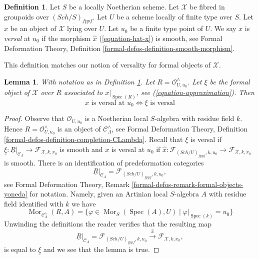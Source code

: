 \documentclass{stacks-project}
\theoremstyle{plain}
\newtheorem{lemma}[subsection]{Lemma}
\theoremstyle{definition}
\newtheorem{definition}[subsection]{Definition}
\theoremstyle{remark}
\numberwithin{equation}{subsection}
\def\Spec{\mathop{\mathrm{Spec}}}
\def\Sch{\mathit{Sch}}
\def\Mor{\mathop{\mathrm{Mor}}\nolimits}
\begin{document}
\begin{definition}
\label{definition-versal}
Let $S$ be a locally Noetherian scheme.
Let $\mathcal{X}$ be fibred in groupoids over $(\Sch/S)_{fppf}$.
Let $U$ be a scheme locally of finite type over $S$.
Let $x$ be an object of $\mathcal{X}$ lying over $U$.
Let $u_0$ be a finite type point of $U$.
We say $x$ is {\it versal} at $u_0$ if the morphism $\hat x$
(\ref{equation-hat-x}) is smooth, see Formal Deformation Theory, Definition
\ref{formal-defos-definition-smooth-morphism}.
\end{definition}

\noindent
This definition matches our notion of versality for formal objects of
$\mathcal{X}$.

\begin{lemma}
\label{lemma-versality-matches}
With notation as in Definition \ref{definition-versal}.
Let $R = \mathcal{O}_{U, u_0}^\wedge$.
Let $\xi$ be the formal object of $\mathcal{X}$
over $R$ associated to $x|_{\Spec(R)}$, see (\ref{equation-approximation}).
Then
$$
x\text{ is versal at }u_0
\Leftrightarrow
\xi\text{ is versal}
$$
\end{lemma}

\begin{proof}
Observe that $\mathcal{O}_{U, u_0}$ is a Noetherian local $S$-algebra
with residue field $k$. Hence $R = \mathcal{O}_{U, u_0}^\wedge$ is an object of
$\mathcal{C}_\Lambda^\wedge$, see Formal Deformation Theory, Definition
\ref{formal-defos-definition-completion-CLambda}.
Recall that $\xi$ is versal if
$\underline{\xi} : \underline{R}|_{\mathcal{C}_\Lambda} \to
\mathcal{F}_{\mathcal{X}, k, x_0}$
is smooth and $x$ is versal at $u_0$ if
$\hat x : \mathcal{F}_{(\Sch/U)_{fppf}, k, u_0}
\to \mathcal{F}_{\mathcal{X}, k, x_0}$ is smooth.
There is an identification of predeformation categories
$$
\underline{R}|_{\mathcal{C}_\Lambda}
=
\mathcal{F}_{(\Sch/U)_{fppf}, k, u_0},
$$
see Formal Deformation Theory, Remark
\ref{formal-defos-remark-formal-objects-yoneda} for notation.
Namely, given an Artinian local $S$-algebra $A$ with residue field
identified with $k$ we have
$$
\Mor_{\mathcal{C}_\Lambda^\wedge}(R, A) =
\{\varphi \in \Mor_S(\Spec(A), U) \mid \varphi|_{\Spec(k)} = u_0\}
$$
Unwinding the definitions the reader verifies that the resulting map
$$
\underline{R}|_{\mathcal{C}_\Lambda} =
\mathcal{F}_{(\Sch/U)_{fppf}, k, u_0}
\xrightarrow{\hat x}
\mathcal{F}_{\mathcal{X}, k, x_0},
$$
is equal to $\underline{\xi}$ and we see that the lemma is true.
\end{proof}
\end{document}
